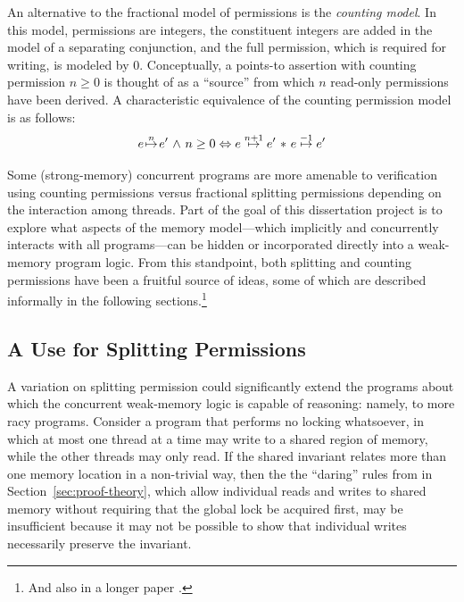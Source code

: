 \documentclass[11pt]{report}
\begin{document}
An alternative to the fractional model of permissions is the \emph{counting model}. In this model, permissions are integers, the constituent integers are added in the model of a separating conjunction, and the full permission, which is required for writing, is modeled by 0. Conceptually, a points-to assertion with counting permission $n \geq 0$ is thought of as a ``source'' from which $n$ read-only permissions have been derived. A characteristic equivalence of the counting permission model is as follows: \[ e \stackrel{n}{\!\mapsto\!} e' \operatorname{\,\wedge\,} n \geq 0 \Leftrightarrow e \stackrel{n+1}{\!\mapsto\!} e' \operatorname{\,\ast\,} e \stackrel{-1}{\!\mapsto\!} e'\] 

Some (strong-memory) concurrent programs are more amenable to verification using counting permissions versus fractional splitting permissions depending on the interaction among threads. Part of the goal of this dissertation project is to explore what aspects of the memory model---which implicitly and concurrently interacts with all programs---can be hidden or incorporated directly into a weak-memory program logic. From this standpoint, both splitting and counting permissions have been a fruitful source of ideas, some of which are described informally in the following sections.\footnote{And also in a longer paper \cite{lola11}.}


\subsection{A Use for Splitting Permissions}

A variation on splitting permission could significantly extend the programs about which the concurrent weak-memory logic is capable of reasoning: namely, to more racy programs. Consider a program that performs no locking whatsoever, in which at most one thread at a time may write to a shared region of memory, while the other threads may only read. If the shared invariant relates more than one memory location in a non-trivial way, then the the ``daring'' rules from in Section~\ref{sec:proof-theory}, which allow individual reads and writes to shared memory without requiring that the global lock be acquired first, may be insufficient because it may not be possible to show that individual writes necessarily preserve the invariant.
\end{document}
